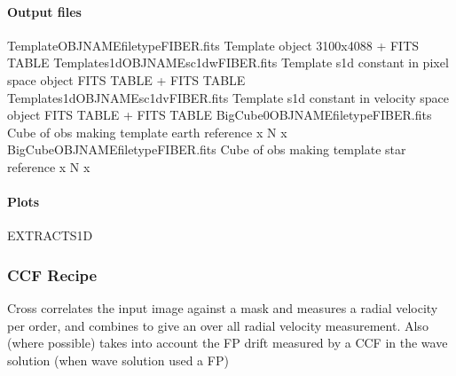 \documentclass[a4paper,10pt,english]{report}
\begin{document}
\paragraph{Output files}
\label{\detokenize{user/spirou/recipes/make_template:output-files}}
\begin{sphinxVerbatim}[commandchars=\\\{\}]
Template\PYGZus{}OBJNAME\PYGZus{}filetype\PYGZus{}FIBER.fits   Template  object 3100x4088 + FITS TABLE
Template\PYGZus{}s1d\PYGZus{}OBJNAME\PYGZus{}sc1d\PYGZus{}w\PYGZus{}FIBER.fits   Template s1d constant in pixel space  object FITS TABLE + FITS TABLE
Template\PYGZus{}s1d\PYGZus{}OBJNAME\PYGZus{}sc1d\PYGZus{}v\PYGZus{}FIBER.fits   Template s1d constant in velocity space  object FITS TABLE + FITS TABLE
BigCube0\PYGZus{}OBJNAME\PYGZus{}filetype\PYGZus{}FIBER.fits   Cube of obs making template earth reference  x N x 
BigCube\PYGZus{}OBJNAME\PYGZus{}filetype\PYGZus{}FIBER.fits    Cube of obs making template star reference  x N x 
\end{sphinxVerbatim}


\paragraph{Plots}
\label{\detokenize{user/spirou/recipes/make_template:plots}}
\begin{sphinxVerbatim}[commandchars=\\\{\}]
EXTRACT\PYGZus{}S1D
\end{sphinxVerbatim}


\subsubsection{CCF Recipe}
\label{\detokenize{user/spirou/recipes/ccf:ccf-recipe}}\label{\detokenize{user/spirou/recipes/ccf:recipes-spirou-ccf}}\label{\detokenize{user/spirou/recipes/ccf::doc}}
Cross correlates the input image against a mask and measures a radial velocity
per order, and combines to give an over all radial velocity measurement.
Also (where possible) takes into account the FP drift measured by a CCF in the
wave solution (when wave solution used a FP)
\end{document}
